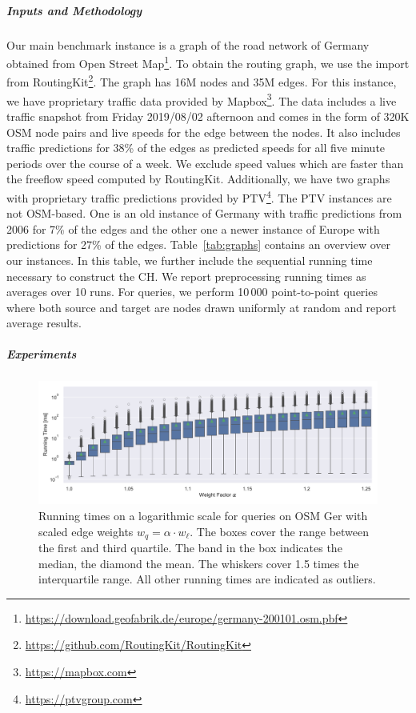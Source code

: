 \documentclass[a4paper,UKenglish,cleveref, autoref, thm-restate]{lipics-v2021}
\begin{document}
\subparagraph{Inputs and Methodology}
Our main benchmark instance is a graph of the road network of Germany obtained from Open Street Map\footnote{\url{https://download.geofabrik.de/europe/germany-200101.osm.pbf}}.
To obtain the routing graph, we use the import from RoutingKit\footnote{\url{https://github.com/RoutingKit/RoutingKit}}.
The graph has 16M nodes and 35M edges.
For this instance, we have proprietary traffic data provided by Mapbox\footnote{\url{https://mapbox.com}}.
The data includes a live traffic snapshot from Friday 2019/08/02 afternoon and comes in the form of 320K OSM node pairs and live speeds for the edge between the nodes.
It also includes traffic predictions for 38\% of the edges as predicted speeds for all five minute periods over the course of a week.
We exclude speed values which are faster than the freeflow speed computed by RoutingKit.
Additionally, we have two graphs with proprietary traffic predictions provided by PTV\footnote{\url{https://ptvgroup.com}}.
The PTV instances are not OSM-based.
One is an old instance of Germany with traffic predictions from 2006 for 7\% of the edges and the other one a newer instance of Europe with predictions for 27\% of the edges.
Table~\ref{tab:graphs} contains an overview over our instances.
In this table, we further include the sequential running time necessary to construct the CH.
We report preprocessing running times as averages over 10 runs.
For queries, we perform 10\,000 point-to-point queries where both source and target are nodes drawn uniformly at random and report average results.

\subparagraph{Experiments}

\begin{figure}
\centering
\includegraphics[width=\linewidth]{fig/scaled_weights.pdf}
\caption{
Running times on a logarithmic scale for queries on OSM Ger with scaled edge weights $w_q = \alpha \cdot w_\ell$.
The boxes cover the range between the first and third quartile.
The band in the box indicates the median, the diamond the mean.
The whiskers cover 1.5 times the interquartile range.
All other running times are indicated as outliers.
}\label{fig:scaled_weights}
\end{figure}
\end{document}
